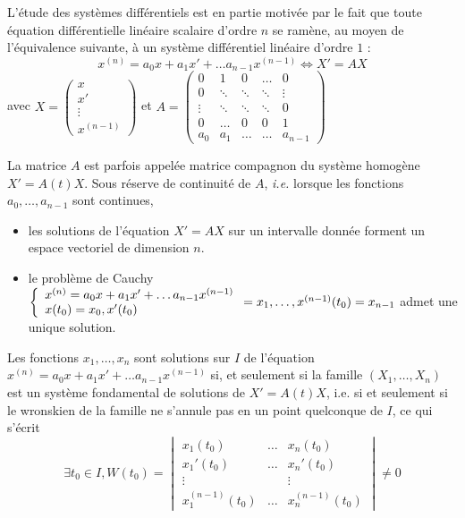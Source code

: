     L’étude des systèmes différentiels est en partie motivée par le fait que toute équation différentielle linéaire scalaire d’ordre $n$ se ramène, au moyen de l’équivalence suivante, à un système différentiel linéaire d’ordre $1$ :
    \[ x^{(n)} = a_0 x + a_1 x' + \ldots a_{n-1} x^{(n-1)} \iff X' = AX \] 
    avec $X = \begin{pmatrix}
        x \\
        x' \\
        \vdots \\
        x^{(n-1)}
    \end{pmatrix}$ et $A = \begin{pmatrix}
        0 & 1 & 0 & \ldots & 0 \\
        0 & \ddots & \ddots & \ddots & \vdots \\
        \vdots & \ddots & \ddots & \ddots & 0 \\
        0 & \ldots & 0 & 0 & 1 \\
        a_0 & a_1 & \ldots & \ldots & a_{n-1}
    \end{pmatrix}$

    La matrice $A$ est parfois appelée matrice compagnon du système homogène $X' = A(t)X$. Sous réserve de continuité de $A$, \textit{i.e.} lorsque les fonctions $a_0, \ldots, a_{n-1}$ sont continues, 
    \begin{itemize}
        \item les solutions de l’équation $X' = AX$ sur un intervalle donnée forment un espace vectoriel de dimension $n$.
        \item le problème de Cauchy $\et{x^{(n)} = a_0 x + a_1 x' + \ldots a_{n-1} x^{(n-1)}}{x(t_0) = x_0, x'(t_0)} = x_1, \ldots, x^{(n-1)}(t_0) = x_{n-1}$ admet une unique solution.
    \end{itemize}

    Les fonctions $x_1,\ldots,x_n$ sont solutions sur $I$ de l’équation $x^{(n)} = a_0 x + a_1 x' + \ldots a_{n-1} x^{(n-1)}$ si, et seulement si la famille $(X_1,\ldots,X_n)$ est un système fondamental de solutions de $X' = A(t)X$, i.e. si et seulement si le wronskien de la famille ne s’annule pas en un point quelconque de $I$, ce qui s’écrit
    \[ \exists t_0 \in  I, W(t_0) = \begin{vmatrix}
        x_1(t_0) & \ldots & x_n(t_0) \\
        x_1'(t_0) & \ldots & x_n'(t_0) \\
        \vdots & & \vdots \\
        x_1^{(n-1)}(t_0) & \ldots & x_n^{(n-1)}(t_0) 
    \end{vmatrix} \neq 0 \]

